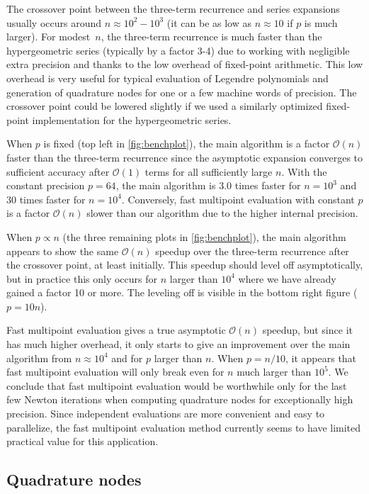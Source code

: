 \documentclass[nohypdvips,review]{siamart0216}
\newcommand{\OO}{\mathcal{O}}
\begin{document}
The crossover point between the
three-term recurrence and series expansions usually occurs
around $n \approx 10^2 - 10^3$ (it can be as low as $n \approx 10$
if $p$ is much larger).
For modest $n$,
the three-term recurrence is much faster
than the hypergeometric series (typically by a factor 3-4)
due to working with negligible extra precision
and thanks to the low overhead of fixed-point arithmetic.
This low overhead is very useful for typical evaluation of
Legendre polynomials and generation of quadrature nodes
for one or a few machine words of precision.
The crossover point could be lowered slightly
if we used a similarly optimized fixed-point implementation
for the hypergeometric series.

When $p$ is fixed (top left in \cref{fig:benchplot}), the main algorithm is
a factor $\OO(n)$ faster
than the three-term recurrence
since the asymptotic expansion converges to sufficient accuracy after
$\OO(1)$ terms for all sufficiently large $n$.
With the constant precision $p = 64$,
the main algorithm is 3.0
times faster for $n = 10^3$ and 30 times faster for $n = 10^4$.
Conversely, fast multipoint evaluation
with constant $p$ is a factor $\OO(n)$ slower than our
algorithm due to the higher internal precision.

When $p \propto n$ (the three remaining plots in \cref{fig:benchplot}), the main algorithm
appears to show the same $\OO(n)$ speedup
over the three-term recurrence after the crossover point, at least initially.
This speedup should level off asymptotically, but
in practice this only occurs for $n$ larger than $10^4$
where we have already gained a factor 10 or more.
The leveling off is visible in the bottom right figure ($p = 10n$).

Fast multipoint evaluation gives a true asymptotic $\OO(n)$ speedup,
but since it has much higher overhead,
it only starts to give an improvement over
the main algorithm from $n \approx 10^4$
and for $p$ larger than $n$.
When $p = n / 10$, it appears that
fast multipoint evaluation will only break even for $n$ much larger than $10^5$.
We conclude that fast multipoint evaluation would be
worthwhile only for the last few Newton iterations
when computing quadrature nodes for exceptionally high precision.
Since independent evaluations are more convenient and easy to parallelize,
the fast multipoint evaluation method
currently seems to have limited practical value for this application.

\subsection{Quadrature nodes}
\end{document}
